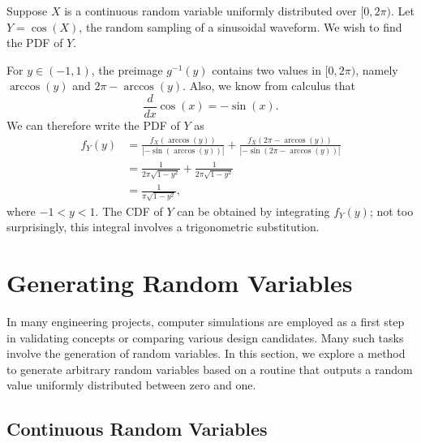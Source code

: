 \begin{example}
Suppose $X$ is a continuous random variable uniformly distributed over $[0, 2 \pi)$.
Let $Y = \cos (X)$, the random sampling of a sinusoidal waveform.
We wish to find the PDF of $Y$.

For $y \in (-1, 1)$, the preimage $g^{-1} (y)$ contains two values in $[0, 2\pi)$, namely $\arccos (y)$ and $2 \pi - \arccos (y)$.
Also, we know from calculus that
\begin{equation*}
\frac{d}{dx} \cos (x) = - \sin (x) .
\end{equation*}
We can therefore write the PDF of $Y$ as
\begin{equation*}
\begin{split}
f_Y (y) &= \frac{f_X( \arccos (y) )}{ \left| - \sin (\arccos (y)) \right|}
+ \frac{f_X( 2 \pi - \arccos (y) )}{ \left| - \sin (2\pi - \arccos (y)) \right| } \\
&= \frac{1}{2 \pi \sqrt{1 - y^2} } + \frac{1}{ 2 \pi \sqrt{ 1 - y^2} } \\
&= \frac{1}{\pi \sqrt{1 - y^2} } ,
\end{split}
\end{equation*}
where $-1 < y < 1$.
The CDF of $Y$ can be obtained by integrating $f_Y (y)$; not too surprisingly, this integral involves a trigonometric substitution.
\end{example}


\section{Generating Random Variables}

In many engineering projects, computer simulations are employed as a first step in validating concepts or comparing various design candidates.
Many such tasks involve the generation of random variables.
In this section, we explore a method to generate arbitrary random variables based on a routine that outputs a random value uniformly distributed between zero and one.

\subsection{Continuous Random Variables}

